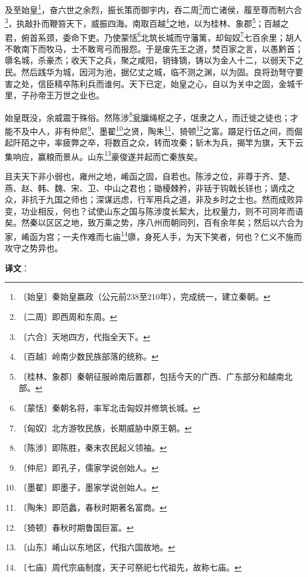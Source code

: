 \documentclass[12pt,UTF-8,openany,a4]{ctexbook}
\begin{document}
\begin{large}
    及至始皇\footnote{〔始皇〕\yiwen 秦始皇嬴政（公元前238至210年），完成统一，建立秦朝。}，奋六世之余烈，振长策而御宇内，吞二周\footnote{〔二周〕\yiwen 即西周和东周。}而亡诸侯，履至尊而制六合\footnote{〔六合〕\yiwen 天地四方，代指全天下。}，执敲扑而鞭笞天下，威振四海。南取百越\footnote{〔百越〕\yiwen 岭南少数民族部落的统称。}之地，以为桂林、象郡\footnote{〔桂林、象郡〕\yiwen 秦朝征服岭南后置郡，包括今天的广西、广东部分和越南北部。}；百越之君，俯首系颈，委命下吏。乃使蒙恬\footnote{〔蒙恬〕\yiwen 秦朝名将，率军北击匈奴并修筑长城。}北筑长城而守藩篱，却匈奴\footnote{〔匈奴〕\yiwen 北方游牧民族，长期威胁中原王朝。}七百余里；胡人不敢南下而牧马，士不敢弯弓而报怨。于是废先王之道，焚百家之言，以愚黔首；隳名城，杀豪杰；收天下之兵，聚之咸阳，销锋镝，铸以为金人十二，以弱天下之民。然后践华为城，因河为池，据亿丈之城，临不测之渊，以为固。良将劲弩守要害之处，信臣精卒陈利兵而谁何。天下已定，始皇之心，自以为关中之固，金城千里，子孙帝王万世之业也。
    
    始皇既没，余威震于殊俗。然陈涉\footnote{〔陈涉〕\yiwen 即陈胜，秦末农民起义领袖。}瓮牖绳枢之子，氓隶之人，而迁徙之徒也；才能不及中人，非有仲尼\footnote{〔仲尼〕\yiwen 即孔子，儒家学说创始人。}、墨翟\footnote{〔墨翟〕\yiwen 即墨子，墨家学说创始人。}之贤，陶朱\footnote{〔陶朱〕\yiwen 即范蠡，春秋时期著名富商。}、猗顿\footnote{〔猗顿〕\yiwen 春秋时期鲁国巨富。}之富。蹑足行伍之间，而倔起阡陌之中，率疲弊之卒，将数百之众，转而攻秦；斩木为兵，揭竿为旗，天下云集响应，赢粮而景从。山东\footnote{〔山东〕\yiwen 崤山以东地区，代指六国故地。}豪俊遂并起而亡秦族矣。
    
    且夫天下非小弱也，雍州之地，崤函之固，自若也。陈涉之位，非尊于齐、楚、燕、赵、韩、魏、宋、卫、中山之君也；锄櫌棘矜，非铦于钩戟长铩也；谪戍之众，非抗于九国之师也；深谋远虑，行军用兵之道，非及乡时之士也。然而成败异变，功业相反，何也？试使山东之国与陈涉度长絜大，比权量力，则不可同年而语矣。然秦以区区之地，致万乘之势，序八州而朝同列，百有余年矣；然后以六合为家，崤函为宫；一夫作难而七庙\footnote{〔七庙〕\yiwen 周代宗庙制度，天子可祭祀七代祖先，故称七庙。}隳，身死人手，为天下笑者，何也？仁义不施而攻守之势异也。

\end{large}


\newpage

\begin{Large}
   \noindent \textbf{译文}：
\end{Large}

\vspace{1em}
\end{document}
